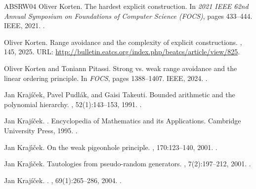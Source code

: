 \documentclass[10pt,a4paper]{article}
\theoremstyle{definition}
\theoremstyle{remark}
\begin{document}
\begin{thebibliography}{ABSRW04}
Oliver Korten.
\newblock The hardest explicit construction.
\newblock In {\em 2021 IEEE 62nd Annual Symposium on Foundations of Computer
  Science (FOCS)}, pages 433--444. IEEE, 2021.
\newblock \href {https://doi.org/10.1109/FOCS52979.2021.00051}
  {}.

Oliver Korten.
\newblock Range avoidance and the complexity of explicit constructions.
, 145, 2025.
\newblock URL:
  \url{http://bulletin.eatcs.org/index.php/beatcs/article/view/825}.

Oliver Korten and Toniann Pitassi.
\newblock Strong vs. weak range avoidance and the linear ordering principle.
\newblock In {\em {FOCS}}, pages 1388--1407. {IEEE}, 2024.
\newblock \href {https://doi.org/10.1109/FOCS61266.2024.00089}
  {}.

Jan Krajíček, Pavel Pudlák, and Gaisi Takeuti.
\newblock Bounded arithmetic and the polynomial hierarchy.
, 52(1):143--153, 1991.
\newblock \href {https://doi.org/10.1016/0168-0072(91)90043-L}
  {}.

Jan Kraj{\'{i}}{\v{c}}ek.
.
\newblock Encyclopedia of Mathematics and its Applications. Cambridge
  University Press, 1995.
\newblock \href {https://doi.org/10.1017/CBO9780511529948}
  {}.

Jan Kraj{\'\i}{\v{c}}ek.
\newblock On the weak pigeonhole principle.
, 170:123--140, 2001.
\newblock \href {https://doi.org/10.4064/fm170-1-8}
  {}.

Jan Kraj{\'\i}{\v{c}}ek.
\newblock Tautologies from pseudo-random generators.
, 7(2):197--212, 2001.
\newblock \href {https://doi.org/10.2307/2687774} {}.

Jan Kraj{\'i}ček.
.
, 69(1):265--286, 2004.
\newblock \href {https://doi.org/10.2178/jsl/1080938841}
  {}.


\end{thebibliography}
\end{document}
